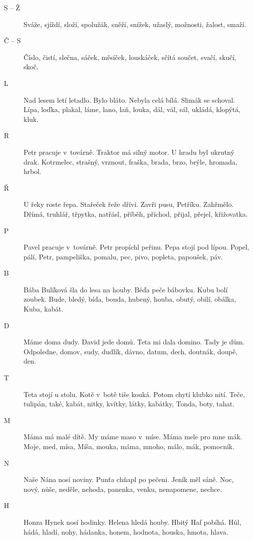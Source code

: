 \begin{multicols}{2}
\begin{description}
\item[S -- Ž] Sváže, sjíždí, složí, spolužák, sněží, snížek, užaslý,
možnosti, žalost, smaží.

\item[Č -- S] Číslo, čistí, slečna, sáček, měsíček, louskáček, sčítá součet, 
svačí, skučí, skoč.

\item[L] Nad lesem letí letadlo. Bylo bláto. Nebyla celá bílá. Slimák 
se schoval. Lípa, loďka, plakal, láme, lano, laň, louka, dál, vál, sál,
ukládá, klopýtá, kluk.

\item[R] Petr pracuje v~továrně. Traktor má silný motor. U hradu 
byl ukrutný drak. Kotrmelec, strašný, vrznout, fraška, brada, brzo, brýle, hromada, hrbol.

\item[Ř] U řeky roste řepa. Stařeček řeže dříví. Zavři pusu, Petříku. Zahřmělo.
Dřímá, truhlář, třpytka, natřásl, příběh, příchod, přijal, přejel, křižovatka.

\item[P] Pavel pracuje v~továrně. Petr propíchl peřinu. Pepa stojí 
pod lípou. Popel, pálí, Petr, pampeliška, pomalu, pec, pivo, popleta,
papoušek, páv.

\item[B] Bába Bulíková šla do lesa na houby. Béďa peče bábovku. Kubu 
bolí zoubek. Bude, bledý, bída, bouda, hubený, houba, obutý, obilí, obálka, 
Kuba, kabát.

\item[D] Máme doma dudy. David jede domů. Teta mi dala domino. Tady je 
dům. Odpoledne, domov, sudy, dudlík, dávno, datum, dech, doutnák, 
doupě, den.

\item[T] Teta stojí u stolu. Kotě v~botě tiše kouká. Potom chytí 
klubko nití. Teče, tulipán, také, kabát, nitky, kvítky, látky, kabátky,
Tonda, boty, tahat.

\item[M] Máma má malé dítě. My máme maso v~míse. Máma mele pro 
mne mák. Moje, med, mísa, Míša, mouka, máma, mnoho, málo, mák, pomocník.

\item[N] Naše Nána nosí noviny. Punťa chňapl po pečeni. Jeník měl sáně.
Noc, nový, nůše, neděle, nehoda, panenka, venku, nenapomene, nechce.

\item[H] Honza Hynek nosí hodinky. Helena hledá houby. Hbitý Haf pobíhá.
Hůl, hádá, hladí, nohy, hádanka, honem, hodnota, houska, hmota, hlava.


\end{description}
\end{multicols}
